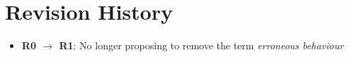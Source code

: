 
\section*{Revision History}
\begin{itemize}
\item \textbf{R0 $\rightarrow$ R1}: No longer proposing to remove the term \emph{erroneous behaviour}
\end{itemize}


\renewcommand{\addcontentsline}[3]{}%










